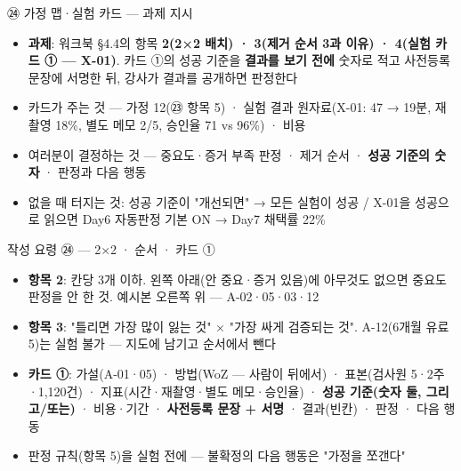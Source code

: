 \begin{frame}{㉔ 가정 맵·실험 카드 — 과제 지시}
\begin{itemize}
\item \textbf{과제}: 워크북 §4.4의 항목 \textbf{2(2×2 배치) · 3(제거 순서 3과 이유) · 4(실험 카드 ① — X-01)}. 카드 ①의 성공 기준을 \textbf{결과를 보기 전에} 숫자로 적고 사전등록 문장에 서명한 뒤, 강사가 결과를 공개하면 판정한다
\item 카드가 주는 것 — 가정 12(㉓ 항목 5) · 실험 결과 원자료(X-01: 47 → 19분, 재촬영 18\%, 별도 메모 2/5, 승인율 71 vs 96\%) · 비용
\item 여러분이 결정하는 것 — 중요도·증거 부족 판정 · 제거 순서 · \textbf{성공 기준의 숫자} · 판정과 다음 행동
\item 없을 때 터지는 것: 성공 기준이 "개선되면" → 모든 실험이 성공 / X-01을 성공으로 읽으면 Day6 자동판정 기본 ON → Day7 채택률 22\%
\end{itemize}
\end{frame}

\begin{frame}{작성 요령 ㉔ — 2×2 · 순서 · 카드 ①}
\begin{itemize}
\item \textbf{항목 2}: 칸당 3개 이하. 왼쪽 아래(안 중요·증거 있음)에 아무것도 없으면 중요도 판정을 안 한 것. 예시본 오른쪽 위 — A-02·05·03·12
\item \textbf{항목 3}: "틀리면 가장 많이 잃는 것" × "가장 싸게 검증되는 것". A-12(6개월 유료 5)는 실험 불가 — 지도에 남기고 순서에서 뺀다
\item \textbf{카드 ①}: 가설(A-01·05) · 방법(WoZ — 사람이 뒤에서) · 표본(검사원 5·2주·1,120건) · 지표(시간·재촬영·별도 메모·승인율) · \textbf{성공 기준(숫자 둘, 그리고/또는)} · 비용·기간 · \textbf{사전등록 문장 + 서명} · 결과(빈칸) · 판정 · 다음 행동
\item 판정 규칙(항목 5)을 실험 전에 — 불확정의 다음 행동은 "가정을 쪼갠다"
\end{itemize}
\end{frame}

